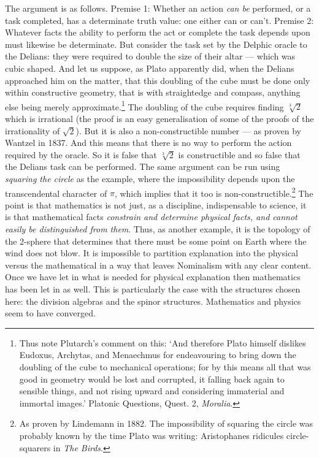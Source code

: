 \documentclass[11pt,oneside,a4paper]{article}
\newcommand*{\sqrtwo}{\ensuremath{\sqrt{2}}\hspace{0.5ex}\xspace}
\begin{document}
The argument is as follows. Premise 1: Whether an action \textit{can be} performed, or a task completed, has a determinate truth value: one either can or can't. Premise 2: Whatever facts the ability to perform the act or complete the task depends upon must likewise  be determinate.  But consider the task set by the Delphic oracle to the Delians: they were required to double the size of their altar --- which was cubic shaped. And let us suppose, as Plato apparently did, when the Delians approached him on the matter, that this doubling of the cube must be done only within constructive geometry, that is with straightedge and compass, anything else being merely approximate.\footnote{Thus note Plutarch's comment on this: `And therefore Plato himself dislikes Eudoxus, Archytas, and Menaechmus for endeavouring to bring down the doubling of the cube to mechanical operations; for by this means all that was good in geometry would be lost and corrupted, it falling back again to sensible things, and not rising upward and considering immaterial and immortal images\xelip .' Platonic Questions, Quest. 2, \textit{Moralia}.} The doubling of the cube requires finding $\sqrt[3]{2}$ which is irrational (the proof is an easy generalisation of some of the proofs of the irrationality of \sqrtwo). But it is also a non-constructible number --- as proven by Wantzel in 1837. And this means that there is no way to perform the action required by the oracle. So it is false that $\sqrt[3]{2}$ is constructible and so false that the Delians task can be performed. The same argument can be run using \textit{squaring the circle} as the example, where the impossibility depends upon the transcendental character of $\pi$, which implies that it too is non-constructible.\footnote{As proven by Lindemann in 1882. The impossibility of squaring the circle was probably known by the time Plato was writing: Aristophanes ridicules circle-squarers in \textit{The Birds}.} The point is that mathematics is not just, as a discipline, indispensable to science, it is that mathematical facts \textit{constrain and determine physical facts, and cannot easily be distinguished from them}. Thus, as another example, it is the topology of the 2-sphere that determines that there must be some point on Earth where the wind does not blow. It is impossible to partition explanation into the physical versus the mathematical in a way that leaves Nominalism with any clear content. Once we have let in what is needed for physical explanation then mathematics has been let in as well. This is particularly the case with the structures chosen here: the division algebras and the spinor structures. Mathematics and physics seem to have converged.
\end{document}

